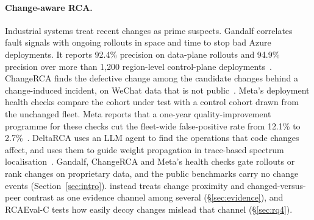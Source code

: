 \paragraph{Change-aware RCA.}
Industrial systems treat recent changes as prime suspects.
Gandalf correlates fault signals with ongoing rollouts in space and time to stop bad Azure deployments. It reports 92.4\% precision on data-plane rollouts and 94.9\% precision over more than 1,200 region-level control-plane deployments~\cite{gandalf2020}.
ChangeRCA finds the defective change among the candidate changes behind a change-induced incident, on WeChat data that is not public~\cite{changerca2024}.
Meta's deployment health checks compare the cohort under test with a control cohort drawn from the unchanged fleet. Meta reports that a one-year quality-improvement programme for these checks cut the fleet-wide false-positive rate from 12.1\% to 2.7\%~\cite{metahealth2026}.
DeltaRCA uses an LLM agent to find the operations that code changes affect, and uses them to guide weight propagation in trace-based spectrum localisation~\cite{deltarca}.
Gandalf, ChangeRCA and Meta's health checks gate rollouts or rank changes on proprietary data, and the public benchmarks carry no change events (Section~\ref{sec:intro}).
\sys instead treats change proximity and changed-versus-peer contrast as one evidence channel among several (\S\ref{sec:evidence}), and RCAEval-C tests how easily decoy changes mislead that channel (\S\ref{sec:rq4}).

